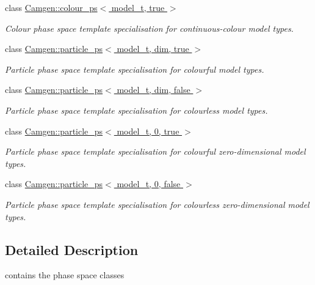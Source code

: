 \begin{DoxyCompactItemize}
class \hyperlink{a00091}{Camgen\-::colour\-\_\-ps$<$ model\-\_\-t, true $>$}
\begin{DoxyCompactList}\small\item\em Colour phase space template specialisation for continuous-\/colour model types. \end{DoxyCompactList}\item 
class \hyperlink{a00404}{Camgen\-::particle\-\_\-ps$<$ model\-\_\-t, dim, true $>$}
\begin{DoxyCompactList}\small\item\em Particle phase space template specialisation for colourful model types. \end{DoxyCompactList}\item 
class \hyperlink{a00403}{Camgen\-::particle\-\_\-ps$<$ model\-\_\-t, dim, false $>$}
\begin{DoxyCompactList}\small\item\em Particle phase space template specialisation for colourless model types. \end{DoxyCompactList}\item 
class \hyperlink{a00402}{Camgen\-::particle\-\_\-ps$<$ model\-\_\-t, 0, true $>$}
\begin{DoxyCompactList}\small\item\em Particle phase space template specialisation for colourful zero-\/dimensional model types. \end{DoxyCompactList}\item 
class \hyperlink{a00401}{Camgen\-::particle\-\_\-ps$<$ model\-\_\-t, 0, false $>$}
\begin{DoxyCompactList}\small\item\em Particle phase space template specialisation for colourless zero-\/dimensional model types. \end{DoxyCompactList}\end{DoxyCompactItemize}


\subsection{Detailed Description}
contains the phase space classes 